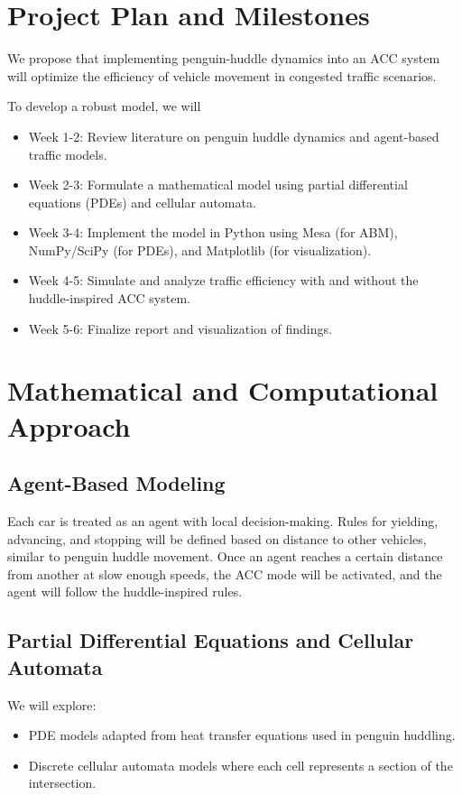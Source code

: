 \documentclass[10pt]{article}
\begin{document}
\section*{Project Plan and Milestones}

We propose that implementing penguin-huddle dynamics into an ACC system will optimize the efficiency of vehicle movement in congested traffic scenarios.

To develop a robust model, we will

\begin{itemize}
    \item Week 1-2: Review literature on penguin huddle dynamics and agent-based traffic models.
    \item Week 2-3: Formulate a mathematical model using partial differential equations (PDEs) and cellular automata.
    \item Week 3-4: Implement the model in Python using Mesa (for ABM), NumPy/SciPy (for PDEs), and Matplotlib (for visualization).
    \item Week 4-5: Simulate and analyze traffic efficiency with and without the huddle-inspired ACC system.
    \item Week 5-6: Finalize report and visualization of findings.
\end{itemize}

\section*{Mathematical and Computational Approach}

\subsection*{Agent-Based Modeling}

Each car is treated as an agent with local decision-making. Rules for yielding, advancing, and stopping will be defined based on distance to other vehicles, similar to penguin huddle movement.
Once an agent reaches a certain distance from another at slow enough speeds, the ACC mode will be activated, and the agent will follow the huddle-inspired rules.

\subsection*{Partial Differential Equations and Cellular Automata}
We will explore:
\begin{itemize}
    \item PDE models adapted from heat transfer equations used in penguin huddling.
    \item Discrete cellular automata models where each cell represents a section of the intersection.
\end{itemize}
\end{document}
